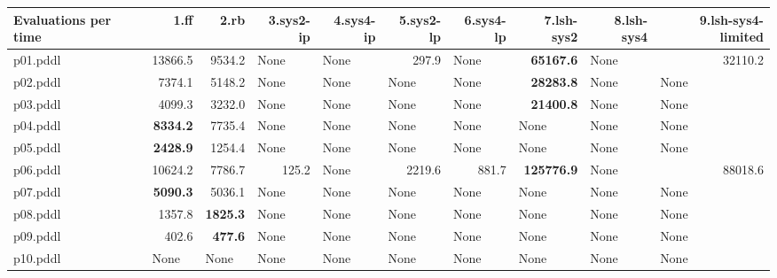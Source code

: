 \documentclass{article}
\begin{document}
\begin{tabular}{@{}lrrrrrrrrr@{}}
Evaluations per time & 1.ff & 2.rb & 3.sys2-ip & 4.sys4-ip & 5.sys2-lp & 6.sys4-lp & 7.lsh-sys2 & 8.lsh-sys4 & 9.lsh-sys4-limited \\
\midrule
p01.pddl & 13866.5 & 9534.2 & \multicolumn{1}{|l|}{None} & \multicolumn{1}{|l|}{None} & 297.9 & \multicolumn{1}{|l|}{None} & \textbf{65167.6} & \multicolumn{1}{|l|}{None} & 32110.2 \\
p02.pddl & 7374.1 & 5148.2 & \multicolumn{1}{|l|}{None} & \multicolumn{1}{|l|}{None} & \multicolumn{1}{|l|}{None} & \multicolumn{1}{|l|}{None} & \textbf{28283.8} & \multicolumn{1}{|l|}{None} & \multicolumn{1}{|l|}{None} \\
p03.pddl & 4099.3 & 3232.0 & \multicolumn{1}{|l|}{None} & \multicolumn{1}{|l|}{None} & \multicolumn{1}{|l|}{None} & \multicolumn{1}{|l|}{None} & \textbf{21400.8} & \multicolumn{1}{|l|}{None} & \multicolumn{1}{|l|}{None} \\
p04.pddl & \textbf{8334.2} & 7735.4 & \multicolumn{1}{|l|}{None} & \multicolumn{1}{|l|}{None} & \multicolumn{1}{|l|}{None} & \multicolumn{1}{|l|}{None} & \multicolumn{1}{|l|}{None} & \multicolumn{1}{|l|}{None} & \multicolumn{1}{|l|}{None} \\
p05.pddl & \textbf{2428.9} & 1254.4 & \multicolumn{1}{|l|}{None} & \multicolumn{1}{|l|}{None} & \multicolumn{1}{|l|}{None} & \multicolumn{1}{|l|}{None} & \multicolumn{1}{|l|}{None} & \multicolumn{1}{|l|}{None} & \multicolumn{1}{|l|}{None} \\
p06.pddl & 10624.2 & 7786.7 & 125.2 & \multicolumn{1}{|l|}{None} & 2219.6 & 881.7 & \textbf{125776.9} & \multicolumn{1}{|l|}{None} & 88018.6 \\
p07.pddl & \textbf{5090.3} & 5036.1 & \multicolumn{1}{|l|}{None} & \multicolumn{1}{|l|}{None} & \multicolumn{1}{|l|}{None} & \multicolumn{1}{|l|}{None} & \multicolumn{1}{|l|}{None} & \multicolumn{1}{|l|}{None} & \multicolumn{1}{|l|}{None} \\
p08.pddl & 1357.8 & \textbf{1825.3} & \multicolumn{1}{|l|}{None} & \multicolumn{1}{|l|}{None} & \multicolumn{1}{|l|}{None} & \multicolumn{1}{|l|}{None} & \multicolumn{1}{|l|}{None} & \multicolumn{1}{|l|}{None} & \multicolumn{1}{|l|}{None} \\
p09.pddl & 402.6 & \textbf{477.6} & \multicolumn{1}{|l|}{None} & \multicolumn{1}{|l|}{None} & \multicolumn{1}{|l|}{None} & \multicolumn{1}{|l|}{None} & \multicolumn{1}{|l|}{None} & \multicolumn{1}{|l|}{None} & \multicolumn{1}{|l|}{None} \\
p10.pddl & \multicolumn{1}{|l|}{None} & \multicolumn{1}{|l|}{None} & \multicolumn{1}{|l|}{None} & \multicolumn{1}{|l|}{None} & \multicolumn{1}{|l|}{None} & \multicolumn{1}{|l|}{None} & \multicolumn{1}{|l|}{None} & \multicolumn{1}{|l|}{None} & \multicolumn{1}{|l|}{None} \\

\end{tabular}
\end{document}
